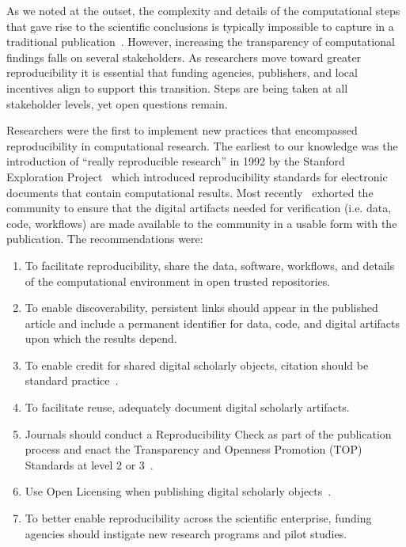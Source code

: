 \documentclass{elsarticle}
\begin{document}
As we noted at the outset, the complexity and details of the computational steps that gave rise to the scientific conclusions is typically impossible to capture in a traditional publication~\cite{victoria01}. However, increasing the transparency of computational findings falls on several stakeholders. As researchers move toward greater reproducibility it is essential that funding agencies, publishers, and local incentives align to support this transition. Steps are being taken at all stakeholder levels, yet open questions remain. %

Researchers were the first to implement new practices that encompassed reproducibility in computational research. The earliest to our knowledge was the introduction of ``really reproducible research'' in 1992 by the Stanford Exploration Project~\cite{victoria02} which introduced reproducibility standards for electronic documents that contain computational results. Most recently~\cite{victoria03} exhorted the community to ensure that the digital artifacts needed for verification (i.e. data, code, workflows) are made available to the community in a usable form with the publication. The recommendations were:

\begin{enumerate}
	\item To facilitate reproducibility, share the data, software, workflows, and details of the computational environment in open trusted repositories.
    \item To enable discoverability, persistent links should appear in the published article and include a permanent identifier for data, code, and digital artifacts upon which the results depend.
    \item To enable credit for shared digital scholarly objects, citation should be standard practice~\cite{victoria04,victoria05}.
    \item To facilitate reuse, adequately document digital scholarly artifacts.
    \item Journals should conduct a Reproducibility Check as part of the publication process and enact the Transparency and Openness Promotion (TOP) Standards at level 2 or 3~\cite{victoria06}.
    \item Use Open Licensing when publishing digital scholarly objects~\cite{victoria07,victoria08}.
    \item To better enable reproducibility across the scientific enterprise, funding agencies should instigate new research programs and pilot studies.
\end{enumerate}
\end{document}
